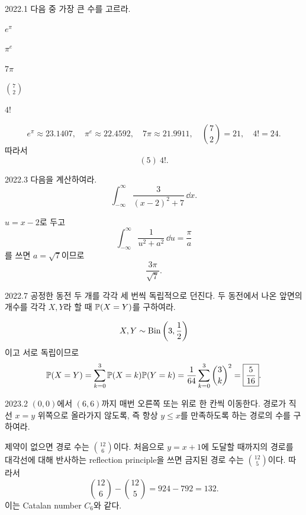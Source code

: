 \begin{pastproblem}{2022.1}
다음 중 가장 큰 수를 고르라.
\begin{problemchoices}
\item $e^\pi$
\item $\pi^e$
\item $7\pi$
\item $\binom72$
\item $4!$
\end{problemchoices}
\end{pastproblem}

\begin{solution}
\[
e^\pi\approx23.1407,\quad
\pi^e\approx22.4592,\quad
7\pi\approx21.9911,\quad
\binom72=21,\quad
4!=24.
\]
따라서
\[
\boxed{(5)\ 4!}.
\]
\end{solution}

\begin{pastproblem}{2022.3}
다음을 계산하여라.
\[
\int_{-\infty}^{\infty}\frac{3}{(x-2)^2+7}\,\dd x.
\]
\end{pastproblem}

\begin{solution}
$u=x-2$로 두고
\[
\int_{-\infty}^{\infty}\frac{1}{u^2+a^2}\,\dd u=\frac\pi a
\]
를 쓰면 $a=\sqrt7$이므로
\[
\boxed{\frac{3\pi}{\sqrt7}}.
\]
\end{solution}

\begin{pastproblem}{2022.7}
공정한 동전 두 개를 각각 세 번씩 독립적으로 던진다. 두 동전에서 나온 앞면의 개수를 각각 $X,Y$라 할 때 $\mathbb{P}(X=Y)$를 구하여라.
\end{pastproblem}

\begin{solution}
\[
X,Y\sim\operatorname{Bin}\left(3,\frac12\right)
\]
이고 서로 독립이므로
\[
\mathbb{P}(X=Y)
=\sum_{k=0}^3\mathbb{P}(X=k)\mathbb{P}(Y=k)
=\frac1{64}\sum_{k=0}^3\binom3k^2
=\boxed{\frac5{16}}.
\]
\end{solution}

\begin{pastproblem}{2023.2}
$(0,0)$에서 $(6,6)$까지 매번 오른쪽 또는 위로 한 칸씩 이동한다. 경로가 직선 $x=y$ 위쪽으로 올라가지 않도록, 즉 항상 $y\le x$를 만족하도록 하는 경로의 수를 구하여라.
\end{pastproblem}

\begin{solution}
제약이 없으면 경로 수는 $\binom{12}{6}$이다. 처음으로 $y=x+1$에 도달할 때까지의 경로를 대각선에 대해 반사하는 reflection principle을 쓰면 금지된 경로 수는 $\binom{12}{5}$이다. 따라서
\[
\binom{12}{6}-\binom{12}{5}=924-792=\boxed{132}.
\]
이는 Catalan number $C_6$와 같다.
\end{solution}

